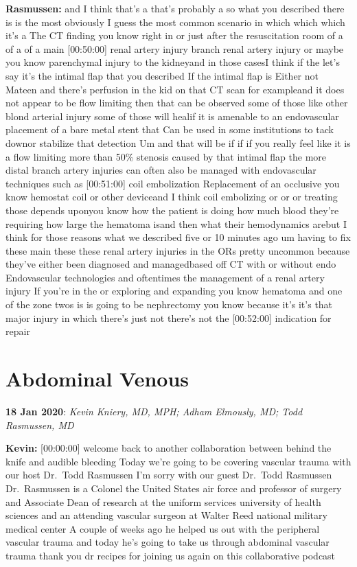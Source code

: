 \documentclass[
]{book}
\begin{document}
\textbf{Rasmussen:} and I think that's a that's probably a so what you
described there is is the most obviously I guess the most common
scenario in which which which it's a The CT finding you know right in or
just after the resuscitation room of a of a of a main {[}00:50:00{]} renal
artery injury branch renal artery injury or maybe you know parenchymal
injury to the kidneyand in those casesI think if the let's say it's the
intimal flap that you described If the intimal flap is Either not Mateen
and there's perfusion in the kid on that CT scan for exampleand it does
not appear to be flow limiting then that can be observed some of those
like other blond arterial injury some of those will healif it is
amenable to an endovascular placement of a bare metal stent that Can be
used in some institutions to tack downor stabilize that detection Um and
that will be if if if you really feel like it is a flow limiting more
than 50\% stenosis caused by that intimal flap the more distal branch
artery injuries can often also be managed with endovascular techniques
such as {[}00:51:00{]} coil embolization Replacement of an occlusive you
know hemostat coil or other deviceand I think coil embolizing or or or
treating those depends uponyou know how the patient is doing how much
blood they're requiring how large the hematoma isand then what their
hemodynamics arebut I think for those reasons what we described five or
10 minutes ago um having to fix these main these these renal artery
injuries in the ORs pretty uncommon because they've either been
diagnosed and managedbased off CT with or without endo Endovascular
technologies and oftentimes the management of a renal artery injury If
you're in the or exploring and expanding you know hematoma and one of
the zone twos is is going to be nephrectomy you know because it's it's
that major injury in which there's just not there's not the {[}00:52:00{]}
indication for repair

\hypertarget{abdominal-venous}{%
\section{Abdominal Venous}\label{abdominal-venous}}

\textbf{18 Jan 2020}: \emph{Kevin Kniery, MD, MPH; Adham Elmously, MD; Todd
Rasmussen, MD}

\textbf{Kevin:} {[}00:00:00{]} welcome back to another collaboration between
behind the knife and audible bleeding Today we're going to be covering
vascular trauma with our host Dr.~Todd Rasmussen I'm sorry with our
guest Dr.~Todd Rasmussen Dr.~Rasmussen is a Colonel the United States
air force and professor of surgery and Associate Dean of research at the
uniform services university of health sciences and an attending vascular
surgeon at Walter Reed national military medical center A couple of
weeks ago he helped us out with the peripheral vascular trauma and today
he's going to take us through abdominal vascular trauma thank you dr
recipes for joining us again on this collaborative podcast
\end{document}
